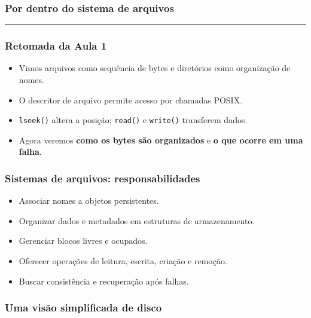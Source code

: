 \documentclass[aspectratio=169,11pt]{beamer}
\begin{document}
\begin{frame}
\frametitle{Por dentro do sistema de arquivos}
\par{}\par\vspace{5mm}{\large Inodes, alocação, cache, falhas e recuperação.}\vfill{\color{lightgray}\rule{\textwidth}{1pt}}
\end{frame}

\begin{frame}
\frametitle{Retomada da Aula 1}
\large
\begin{itemize}
\item Vimos arquivos como sequência de bytes e diretórios como organização de nomes.
\item O descritor de arquivo permite acesso por chamadas POSIX.
\item \texttt{lseek()} altera a posição; \texttt{read()} e \texttt{write()} transferem dados.
\item Agora veremos \textbf{como os bytes são organizados} e \textbf{o que ocorre em uma falha}.
\end{itemize}

\end{frame}

\begin{frame}
\frametitle{Sistemas de arquivos: responsabilidades}
\large
\begin{itemize}
\item Associar nomes a objetos persistentes.
\item Organizar dados e metadados em estruturas de armazenamento.
\item Gerenciar blocos livres e ocupados.
\item Oferecer operações de leitura, escrita, criação e remoção.
\item Buscar consistência e recuperação após falhas.
\end{itemize}

\end{frame}

\begin{frame}
\frametitle{Uma visão simplificada de disco}
\begin{center}\end{center}

\end{frame}
\end{document}
